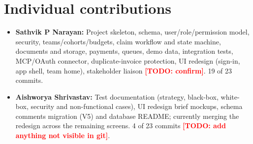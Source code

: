 \documentclass[11pt,a4paper]{article}
\newcommand{\todo}[1]{\textcolor{red}{\textbf{[TODO: #1]}}}
\begin{document}
\section{Individual contributions}

\begin{itemize}[leftmargin=*,nosep]
    \item \textbf{Sathvik P Narayan:} Project skeleton, schema, user/role/permission model, security, teams/cohorts/budgets, claim workflow and state machine, documents and storage, payments, queues, demo data, integration tests, MCP/OAuth connector, duplicate-invoice protection, UI redesign (sign-in, app shell, team home), stakeholder liaison \todo{confirm}. 19 of 23 commits.

    \item \textbf{Aishworya Shrivastav:} Test documentation (strategy, black-box, white-box, security and non-functional cases), UI redesign brief mockups, schema comments migration (V5) and database README; currently merging the redesign across the remaining screens. 4 of 23 commits \todo{add anything not visible in git}.
\end{itemize}
\end{document}
